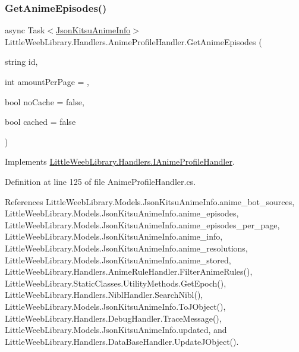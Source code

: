 \mbox{\label{class_little_weeb_library_1_1_handlers_1_1_anime_profile_handler_a5b163eb7e68b1e40904fa55454d8ba54}} 
\subsubsection{\texorpdfstring{Get\+Anime\+Episodes()}{GetAnimeEpisodes()}}
{\footnotesize\ttfamily async Task$<$\mbox{\hyperlink{class_little_weeb_library_1_1_models_1_1_json_kitsu_anime_info}{Json\+Kitsu\+Anime\+Info}}$>$ Little\+Weeb\+Library.\+Handlers.\+Anime\+Profile\+Handler.\+Get\+Anime\+Episodes (\begin{DoxyParamCaption}\item[{string}]{id,  }\item[{int}]{amount\+Per\+Page = {},  }\item[{bool}]{no\+Cache = {\ttfamily false},  }\item[{bool}]{cached = {\ttfamily false} }\end{DoxyParamCaption})}



Implements \mbox{\hyperlink{interface_little_weeb_library_1_1_handlers_1_1_i_anime_profile_handler_ac23c001a51abb10a3d013738000dafec}{Little\+Weeb\+Library.\+Handlers.\+I\+Anime\+Profile\+Handler}}.



Definition at line 125 of file Anime\+Profile\+Handler.\+cs.



References Little\+Weeb\+Library.\+Models.\+Json\+Kitsu\+Anime\+Info.\+anime\+\_\+bot\+\_\+sources, Little\+Weeb\+Library.\+Models.\+Json\+Kitsu\+Anime\+Info.\+anime\+\_\+episodes, Little\+Weeb\+Library.\+Models.\+Json\+Kitsu\+Anime\+Info.\+anime\+\_\+episodes\+\_\+per\+\_\+page, Little\+Weeb\+Library.\+Models.\+Json\+Kitsu\+Anime\+Info.\+anime\+\_\+info, Little\+Weeb\+Library.\+Models.\+Json\+Kitsu\+Anime\+Info.\+anime\+\_\+resolutions, Little\+Weeb\+Library.\+Models.\+Json\+Kitsu\+Anime\+Info.\+anime\+\_\+stored, Little\+Weeb\+Library.\+Handlers.\+Anime\+Rule\+Handler.\+Filter\+Anime\+Rules(), Little\+Weeb\+Library.\+Static\+Classes.\+Utility\+Methods.\+Get\+Epoch(), Little\+Weeb\+Library.\+Handlers.\+Nibl\+Handler.\+Search\+Nibl(), Little\+Weeb\+Library.\+Models.\+Json\+Kitsu\+Anime\+Info.\+To\+J\+Object(), Little\+Weeb\+Library.\+Handlers.\+Debug\+Handler.\+Trace\+Message(), Little\+Weeb\+Library.\+Models.\+Json\+Kitsu\+Anime\+Info.\+updated, and Little\+Weeb\+Library.\+Handlers.\+Data\+Base\+Handler.\+Update\+J\+Object().



